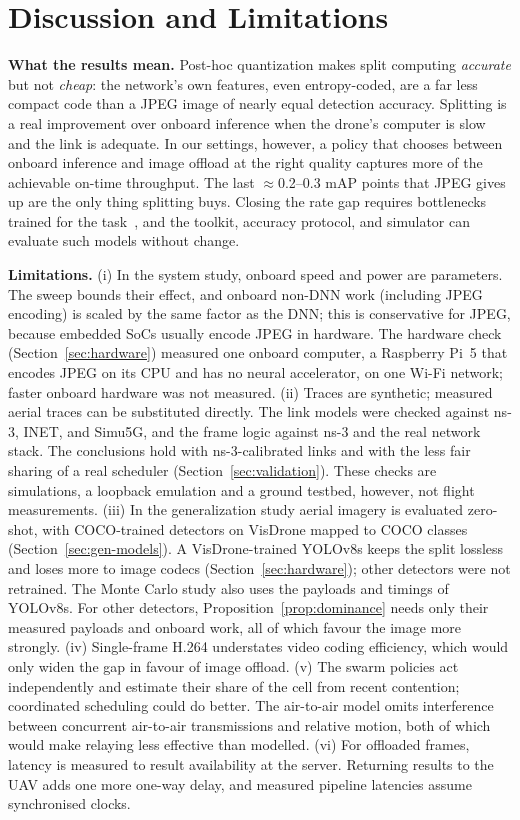 \documentclass[journal,twocolumn,10pt]{IEEEtran}
\begin{document}
\section{Discussion and Limitations}
\textbf{What the results mean.} Post-hoc quantization makes split computing \emph{accurate} but not \emph{cheap}: the network's own features, even entropy-coded, are a far less compact code than a JPEG image of nearly equal detection accuracy. Splitting is a real improvement over onboard inference when the drone's computer is slow and the link is adequate. In our settings, however, a policy that chooses between onboard inference and image offload at the right quality captures more of the achievable on-time throughput. The last $\approx$0.2--0.3 mAP points that JPEG gives up are the only thing splitting buys. Closing the rate gap requires bottlenecks trained for the task~\cite{matsubara2023sc2,shao2020bottlenetpp}, and the toolkit, accuracy protocol, and simulator can evaluate such models without change.

\textbf{Limitations.} (i) In the system study, onboard speed and power are parameters. The sweep bounds their effect, and onboard non-DNN work (including JPEG encoding) is scaled by the same factor as the DNN; this is conservative for JPEG, because embedded SoCs usually encode JPEG in hardware. The hardware check (Section~\ref{sec:hardware}) measured one onboard computer, a Raspberry Pi~5 that encodes JPEG on its CPU and has no neural accelerator, on one Wi-Fi network; faster onboard hardware was not measured. (ii) Traces are synthetic; measured aerial traces can be substituted directly. The link models were checked against ns-3, INET, and Simu5G, and the frame logic against ns-3 and the real network stack. The conclusions hold with ns-3-calibrated links and with the less fair sharing of a real scheduler (Section~\ref{sec:validation}). These checks are simulations, a loopback emulation and a ground testbed, however, not flight measurements. (iii) In the generalization study aerial imagery is evaluated zero-shot, with COCO-trained detectors on VisDrone mapped to COCO classes (Section~\ref{sec:gen-models}). A VisDrone-trained YOLOv8s keeps the split lossless and loses more to image codecs (Section~\ref{sec:hardware}); other detectors were not retrained. The Monte Carlo study also uses the payloads and timings of YOLOv8s. For other detectors, Proposition~\ref{prop:dominance} needs only their measured payloads and onboard work, all of which favour the image more strongly. (iv) Single-frame H.264 understates video coding efficiency, which would only widen the gap in favour of image offload. (v) The swarm policies act independently and estimate their share of the cell from recent contention; coordinated scheduling could do better. The air-to-air model omits interference between concurrent air-to-air transmissions and relative motion, both of which would make relaying less effective than modelled. (vi) For offloaded frames, latency is measured to result availability at the server. Returning results to the UAV adds one more one-way delay, and measured pipeline latencies assume synchronised clocks.
\end{document}
